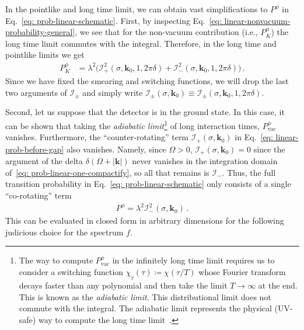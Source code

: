\documentclass[11pt,prd,onecolumn,superscriptaddress,nofootinbib,floatfix,amsmath,amssymb]{revtex4-2}
\newcommand{\bk}{{\bm{k}}}
\newcommand{\vac}{\text{vac}}
\begin{document}
    In the pointlike and long time limit, we can obtain vast simplifications to $P^\phi$ in Eq.~\eqref{eq: prob-linear-schematic}. First, by inspecting Eq.~\eqref{eq: linear-nonvacuum-probability-general}, we see that for the non-vacuum contribution (i.e., $P_K^\phi$) the long time limit commutes with the integral. Therefore, in the long time and pointlike limits we get
    \begin{align}
        P_{K}^{\phi} &= \lambda^2 \bigr(\mathcal{I}_+^2(\sigma,\bk_0,1, 2\pi\delta)+
        \mathcal{I}_{-}^2(\sigma,\bk_0,1, 2\pi\delta)\bigr)\,.
        \label{eq: linear-prob-before-gap}
    \end{align}
    Since we have fixed the smearing and switching functions, we will drop the last two arguments of $\mathcal{I}_\pm$ and simply write $\mathcal{I}_\pm (\sigma,\bk_0)\equiv \mathcal{I}_\pm (\sigma,\bk_0,1, 2\pi\delta)$.
    
    Second, let us suppose that the detector is in the ground state. In this case, it can be shown that taking the \textit{adiabatic limit}\footnote{The way to compute $P^\phi_{\vac}$ in the infinitely long time limit requires us to consider a switching function \mbox{$\chi_{_T}(\tau)\coloneqq \chi(\tau/T)$} whose Fourier transform decays faster than any polynomial and then take the limit $T\to\infty$ at the end. This is known as the \textit{adiabatic limit}. This distributional limit does not commute with the integral. The adiabatic limit represents the physical (UV-safe) way to compute the long time limit~{\cite{Satz_2007,Louko_2008}}.} of long interaction times, $P_{\vac}^{\phi}$ vanishes. Furthermore, the ``counter-rotating'' term $\mathcal{I}_+(\sigma,\bk_0)$ in Eq.~\eqref{eq: linear-prob-before-gap} also vanishes. Namely, since $\Omega>0$, \mbox{$\mathcal{I}_+(\sigma,\bk_0)=0$} since  the argument of the delta $\delta(\Omega+|\bm k |)$ never vanishes in  the integration domain of~\eqref{eq: prob-linear-one-compactify}, so all that remains is $\mathcal{I}_-$.  Thus, the full transition probability in Eq.~\eqref{eq: prob-linear-schematic} only consists of a single ``co-rotating'' term
    \begin{align}
        P^\phi = \lambda^2\mathcal{I}_-^2(\sigma,\bk_0)\,.
        \label{eq: final-linear-probability}
    \end{align}
    This can be evaluated in closed form in arbitrary dimensions for the following judicious choice for the spectrum $f$.
    	
    	
    	
\end{document}
